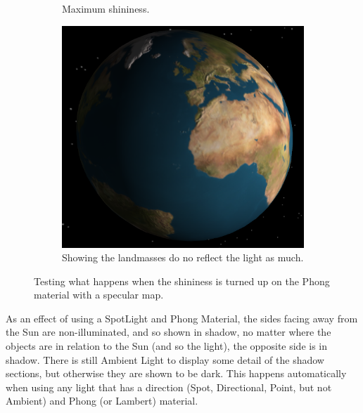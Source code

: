 \documentclass[12pt]{article}
\begin{document}
\begin{figure}[H]
\begin{subfigure}[b]{0.3\textwidth}
                \caption{Maximum shininess.}
                \label{fig:Specular 4.}
	 \end{subfigure}
	         \begin{subfigure}[b]{0.3\textwidth}
                \includegraphics[width=\textwidth]{images/specular5}
                \caption{Showing the landmasses do no reflect the light as much.}
                \label{fig:Specular 5.}
	 \end{subfigure}
	 \caption{Testing what happens when the shininess is turned up on the Phong material with a specular map.}
\end{figure}

As an effect of using a SpotLight and Phong Material, the sides facing away from the Sun are non-illuminated, and so shown in shadow, no matter where the objects are in relation to the Sun (and so the light), the opposite side is in shadow. There is still Ambient Light to display some detail of the shadow sections, but otherwise they are shown to be dark. This happens automatically when using any light that has a direction (Spot, Directional, Point, but not Ambient) and Phong (or Lambert) material.
\end{document}
